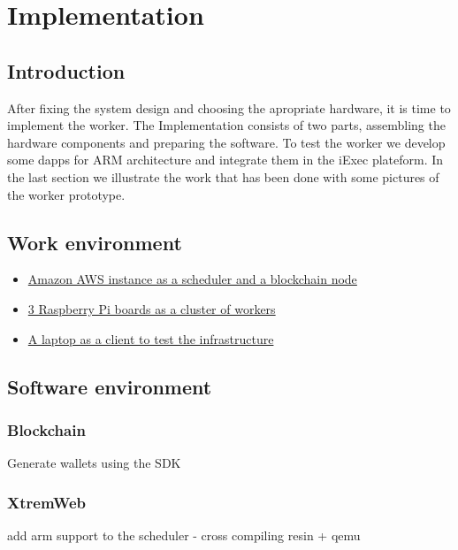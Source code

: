 

\chapter{Implementation}


\section{Introduction}
After fixing the system design and choosing the apropriate hardware, it is time to implement the worker.
The Implementation consists of two parts, assembling the hardware components and preparing the software.
To test the worker we develop some dapps for ARM architecture and integrate them in the iExec plateform.
In the last section we illustrate the work that has been done with some pictures of the worker prototype.

\section{Work environment}

   \begin{itemize}
       \item \underline{Amazon AWS instance as a scheduler and a blockchain node}
       \item \underline{3 Raspberry Pi boards as a cluster of workers}
       \item \underline{A laptop as a client to test the infrastructure}
   \end{itemize}

\section{Software environment}

    \subsection{Blockchain}
    Generate wallets using the SDK

    \subsection{XtremWeb}
    add arm support to the scheduler - cross compiling resin + qemu

